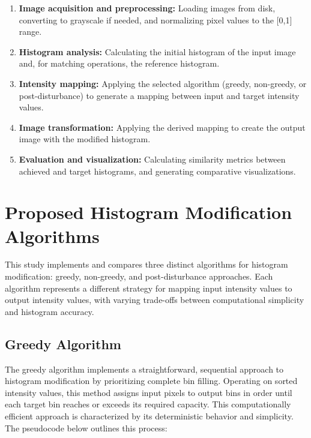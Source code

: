 \documentclass[12pt,a4paper]{article}
\begin{document}
\begin{enumerate}
    \item \textbf{Image acquisition and preprocessing:} Loading images from disk, converting to grayscale if needed, and normalizing pixel values to the [0,1] range.
    
    \item \textbf{Histogram analysis:} Calculating the initial histogram of the input image and, for matching operations, the reference histogram.
    
    \item \textbf{Intensity mapping:} Applying the selected algorithm (greedy, non-greedy, or post-disturbance) to generate a mapping between input and target intensity values.
    
    \item \textbf{Image transformation:} Applying the derived mapping to create the output image with the modified histogram.
    
    \item \textbf{Evaluation and visualization:} Calculating similarity metrics between achieved and target histograms, and generating comparative visualizations.
\end{enumerate}



\section{Proposed Histogram Modification Algorithms}

This study implements and compares three distinct algorithms for histogram modification: greedy, non-greedy, and post-disturbance approaches. Each algorithm represents a different strategy for mapping input intensity values to output intensity values, with varying trade-offs between computational simplicity and histogram accuracy.

\subsection{Greedy Algorithm}

The greedy algorithm implements a straightforward, sequential approach to histogram modification by prioritizing complete bin filling. Operating on sorted intensity values, this method assigns input pixels to output bins in order until each target bin reaches or exceeds its required capacity. This computationally efficient approach is characterized by its deterministic behavior and simplicity. The pseudocode below outlines this process:
\end{document}
